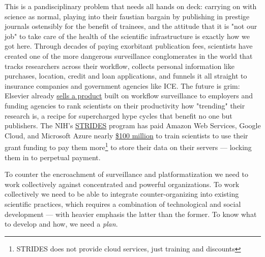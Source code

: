 This is a pandisciplinary problem that needs all hands on deck: carrying on with science as normal, playing into their faustian bargain by publishing in prestige journals ostensibly for the benefit of trainees, and the attitude that it is "not our job" to take care of the health of the scientific infrastructure is exactly how we got here. Through decades of paying exorbitant publication fees, scientists have created one of the more dangerous surveillance conglomerates in the world that tracks researchers across their workflow, collects personal information like purchases, location, credit and loan applications, and funnels it all straight to insurance companies and government agencies like ICE\cite{biddleLexisNexisProvideGiant2021}. The future is grim: Elsevier already \href{https://www.scival.com/landing}{sells a product} built on workflow surveillance to employers and funding agencies to rank scientists on their productivity how "trending" their research is, a recipe for supercharged hype cycles that benefit no one but publishers. The NIH's \href{https://datascience.nih.gov/strides/}{STRIDES} program has paid Amazon Web Services, Google Cloud, and Microsoft Azure nearly \href{https://reporter.nih.gov/search/TUZ2dhR4OEyc2XbE5FSW8g/projects}{\$100 million} to train scientists to use their grant funding to pay them more\footnote{STRIDES does not provide cloud services, just training and discounts} to store their data on their servers --- locking them in to perpetual payment.

To counter the encroachment of surveillance and platformatization we need to work collectively against concentrated and powerful organizations. To work collectively we need to be able to integrate counter-organizing into existing scientific practices, which requires a combination of technological and social development --- with heavier emphasis the latter than the former. To know what to develop and how, we need a \textit{plan}.

